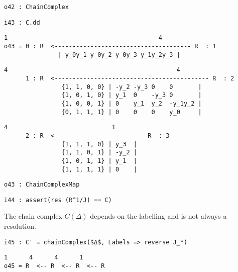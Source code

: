 \documentclass[12pt,leqno]{amsart}
\theoremstyle{definition}
\begin{document}
\begin{lstlisting}[xleftmargin=10pt, aboveskip=1.5pt, belowskip=1.5pt]
o42 : ChainComplex
\end{lstlisting}
\begin{lstlisting}[xleftmargin=10pt, aboveskip=1.5pt, belowskip=1.5pt]
i43 : C.dd
\end{lstlisting}
\begin{lstlisting}[xleftmargin=10pt, lineskip=-10pt, aboveskip=1.5pt, belowskip=3.0pt]
           1                                          4
o43 = 0 : R  <-------------------------------------- R  : 1
               | y_0y_1 y_0y_2 y_0y_3 y_1y_2y_3 |
\end{lstlisting}
\begin{lstlisting}[xleftmargin=10pt, lineskip=-10pt, aboveskip=1.5pt, belowskip=3.0pt]
           4                                               4
      1 : R  <------------------------------------------- R  : 2
                {1, 1, 0, 0} | -y_2 -y_3 0    0       |
                {1, 0, 1, 0} | y_1  0    -y_3 0       |
                {1, 0, 0, 1} | 0    y_1  y_2  -y_1y_2 |
                {0, 1, 1, 1} | 0    0    0    y_0     |
\end{lstlisting}
\begin{lstlisting}[xleftmargin=10pt, lineskip=-10pt, aboveskip=1.5pt, belowskip=1.5pt]
           4                             1
      2 : R  <------------------------- R  : 3
                {1, 1, 1, 0} | y_3  |
                {1, 1, 0, 1} | -y_2 |
                {1, 0, 1, 1} | y_1  |
                {1, 1, 1, 1} | 0    |
\end{lstlisting}
\begin{lstlisting}[xleftmargin=10pt, aboveskip=1.5pt, belowskip=1.5pt]
o43 : ChainComplexMap
\end{lstlisting}
\begin{lstlisting}[xleftmargin=10pt, aboveskip=1.5pt, belowskip=3.0pt]
i44 : assert(res (R^1/J) == C)
\end{lstlisting}
The chain complex $C(\Delta)$ 
depends on the labelling and is not always a resolution.
\begin{lstlisting}[xleftmargin=10pt, aboveskip=3.0pt, belowskip=1.5pt]
i45 : C' = chainComplex($Δ$, Labels => reverse J_*)
\end{lstlisting}
\begin{lstlisting}[xleftmargin=10pt, lineskip=-10pt, aboveskip=1.5pt, belowskip=1.5pt]
       1      4      4      1
o45 = R  <-- R  <-- R  <-- R
\end{lstlisting}
\end{document}
